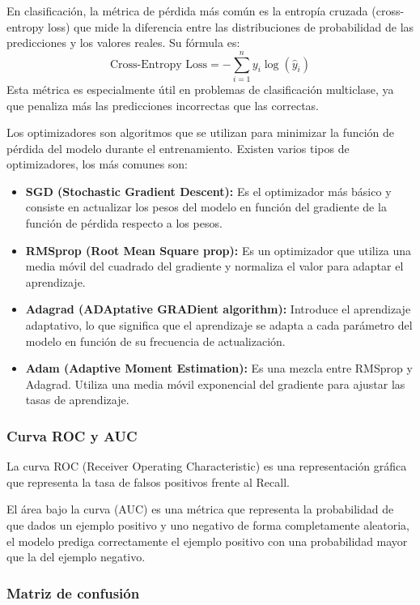 En clasificación, la métrica de pérdida más común es la entropía cruzada (cross-entropy loss) que mide la diferencia entre las distribuciones de probabilidad de las predicciones y los valores reales. Su fórmula es: \begin{equation}
	\text{Cross-Entropy Loss} = -\sum_{i=1}^{n} y_i \log(\hat{y}_i)
\end{equation}
Esta métrica es especialmente útil en problemas de clasificación multiclase, ya que penaliza más las predicciones incorrectas que las correctas.

Los optimizadores son algoritmos que se utilizan para minimizar la función de pérdida del modelo durante el entrenamiento.
Existen varios tipos de optimizadores, los más comunes son:
\begin{itemize}
	\item \textbf{SGD (Stochastic Gradient Descent):} Es el optimizador más básico y consiste en actualizar los pesos del modelo en función del gradiente de la función de pérdida respecto a los pesos.
	\item \textbf{RMSprop (Root Mean Square prop):} Es un optimizador que utiliza una media móvil del cuadrado del gradiente y normaliza el valor para adaptar el aprendizaje.
	\item \textbf{Adagrad (ADAptative GRADient algorithm):} Introduce el aprendizaje adaptativo, lo que significa que el aprendizaje se adapta a cada parámetro del modelo en función de su frecuencia de actualización.
	\item \textbf{Adam (Adaptive Moment Estimation):} Es una mezcla entre RMSprop y Adagrad. Utiliza una media móvil exponencial del gradiente para ajustar las tasas de aprendizaje.
\end{itemize}

\subsubsection{Curva ROC y AUC}

La curva ROC\cite{google:roc-auc} (Receiver Operating Characteristic) es una representación gráfica que representa la tasa de falsos positivos frente al Recall.

El área bajo la curva (AUC) es una métrica que representa la probabilidad de que dados un ejemplo positivo y uno negativo de forma completamente aleatoria, el modelo prediga correctamente el ejemplo positivo con una probabilidad mayor que la del ejemplo negativo.
 
\subsubsection{Matriz de confusión}

